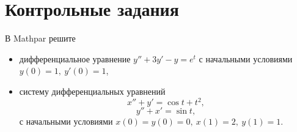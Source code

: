 \section{Контрольные задания}

В  Mathpar решите
\begin{itemize}
 \item дифференциальное уравнение $y''+3y'-y=e^t$ с начальными условиями $y(0)=1, \ y'(0)=1$, 
 \item систему дифференциальных уравнений 
$$x''+y'=\cos t+t^2, $$
$$y''+x'=\sin t, $$
с начальными условиями $x(0)=y(0)=0, \ x(1)=2, \ y(1)=1. $
  \end{itemize}
